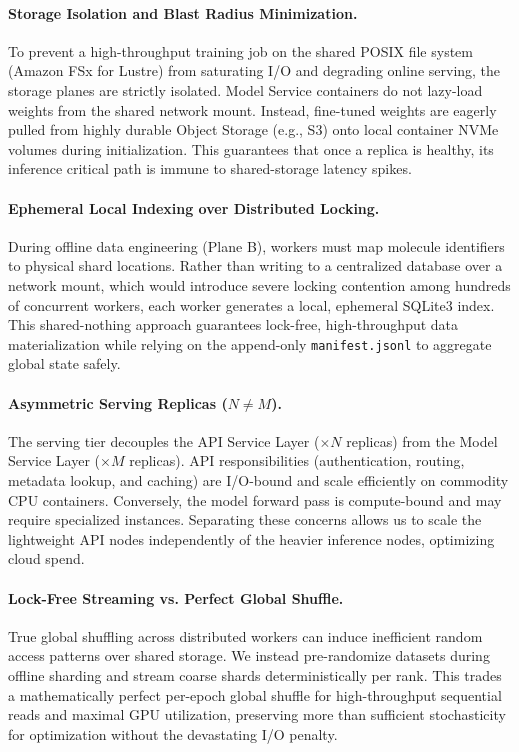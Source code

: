 \documentclass[10pt]{article}
\begin{document}
\paragraph{Storage Isolation and Blast Radius Minimization.}
To prevent a high-throughput training job on the shared POSIX file system (Amazon FSx for Lustre) from saturating I/O and degrading online serving, the storage planes are strictly isolated. Model Service containers do not lazy-load weights from the shared network mount. Instead, fine-tuned weights are eagerly pulled from highly durable Object Storage (e.g., S3) onto local container NVMe volumes during initialization. This guarantees that once a replica is healthy, its inference critical path is immune to shared-storage latency spikes.

\paragraph{Ephemeral Local Indexing over Distributed Locking.}
During offline data engineering (Plane B), workers must map molecule identifiers to physical shard locations. Rather than writing to a centralized database over a network mount, which would introduce severe locking contention among hundreds of concurrent workers, each worker generates a local, ephemeral SQLite3 index. This shared-nothing approach guarantees lock-free, high-throughput data materialization while relying on the append-only \texttt{manifest.jsonl} to aggregate global state safely.

\paragraph{Asymmetric Serving Replicas ($N \neq M$).}
The serving tier decouples the API Service Layer ($\times N$ replicas) from the Model Service Layer ($\times M$ replicas). API responsibilities (authentication, routing, metadata lookup, and caching) are I/O-bound and scale efficiently on commodity CPU containers. Conversely, the model forward pass is compute-bound and may require specialized instances. Separating these concerns allows us to scale the lightweight API nodes independently of the heavier inference nodes, optimizing cloud spend.

\paragraph{Lock-Free Streaming vs. Perfect Global Shuffle.}
True global shuffling across distributed workers can induce inefficient random access patterns over shared storage. We instead pre-randomize datasets during offline sharding and stream coarse shards deterministically per rank. This trades a mathematically perfect per-epoch global shuffle for high-throughput sequential reads and maximal GPU utilization, preserving more than sufficient stochasticity for optimization without the devastating I/O penalty.
\end{document}

